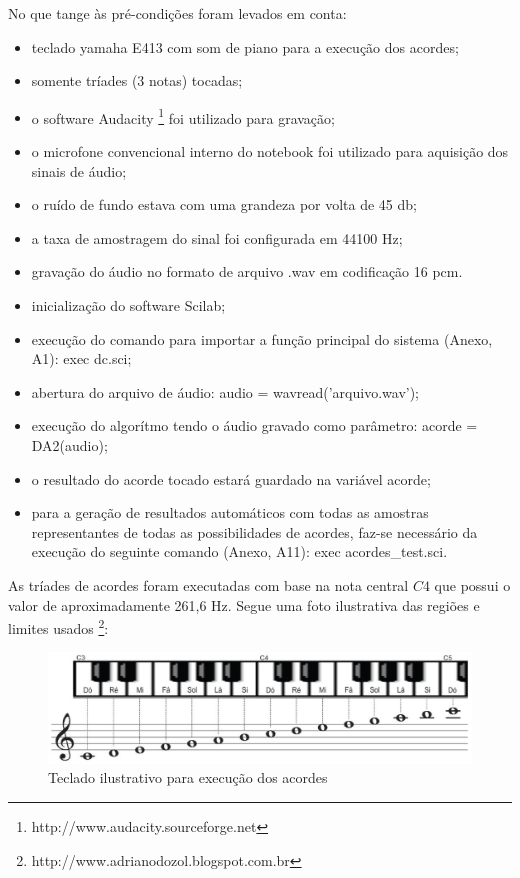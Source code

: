 No que tange às pré-condições foram levados em conta:
\begin{itemize}
    \item teclado yamaha E413 com som de piano para a execução dos acordes;
    \item somente tríades (3 notas) tocadas;
    \item o software Audacity \footnote{http://www.audacity.sourceforge.net} foi utilizado para gravação;
    \item o microfone convencional interno do notebook foi utilizado para aquisição dos sinais de áudio;
    \item o ruído de fundo estava com uma grandeza por volta de 45 db;
    \item a taxa de amostragem do sinal foi configurada em 44100 Hz;
    \item gravação do áudio no formato de arquivo .wav em codificação 16 pcm.
    \item inicialização do software Scilab;
    \item execução do comando para importar a função principal do sistema (Anexo, A1): exec dc.sci;
    \item abertura do arquivo de áudio: audio = wavread('arquivo.wav');
    \item execução do algorítmo tendo o áudio gravado como parâmetro: acorde = DA2(audio);
    \item o resultado do acorde tocado estará guardado na variável acorde;
    \item para a geração de resultados automáticos com todas as amostras representantes de todas as possibilidades de acordes, faz-se necessário da execução do seguinte comando (Anexo, A11): exec acordes{\_}test.sci.
\end{itemize}

\newpage
As tríades de acordes foram executadas com base na nota central $C4$ que possui o valor de aproximadamente 261,6 Hz. Segue uma foto ilustrativa das regiões e limites usados \footnote{http://www.adrianodozol.blogspot.com.br}:

\begin{figure}[h]
	\centering
		\includegraphics[keepaspectratio=true,scale=0.4]{figuras/teclado-tcc1.eps}
	\caption{Teclado ilustrativo para execução dos acordes}
\end{figure}

